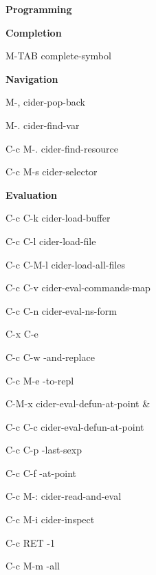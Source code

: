 \documentclass[a4paper,10pt]{article}
\renewcommand\section[1]{\bigskip\par\textbf{\large#1}\medskip}
\renewcommand\subsection[1]{\medskip\par\textbf{#1}\medskip}
\newcommand\keyify[1]{\keys{\ttfamily#1}}
\begin{document}
\begin{multicols}{2}

\section{Programming}
\subsection{Completion}

\begin{keylist}[labelwidth=\widthof{\keyify{C-c C-c}}]
  \item[M-TAB] complete-symbol
\end{keylist}

\subsection{Navigation}
\begin{keylist}[labelwidth=\widthof{\keyify{C-c M-.}}]
  \item[M-,] cider-pop-back
  \item[M-.] cider-find-var
  \item[C-c M-.] cider-find-resource
  \item[C-c M-s] cider-selector
\end{keylist}

\subsection{Evaluation}
\begin{keylist}[labelwidth=\widthof{\keyify{C-c RET}}]
  \item[C-c C-k] cider-load-buffer
  \item[C-c C-l] cider-load-file
  \item[C-c C-M-l] cider-load-all-files
  \item[C-c C-v] cider-eval-commands-map
  \item[C-c C-n] cider-eval-ns-form
  \item[C-x C-e] 
  \item[C-c C-w] \ns                     -and-replace
  \item[C-c M-e] \ns                     -to-repl
  \item[C-M-x]   cider-eval-defun-at-point
\&\item[C-c C-c] cider-eval-defun-at-point
  \item[C-c C-p] -last-sexp
  \item[C-c C-f] \ns                   -at-point
  \item[C-c M-:] cider-read-and-eval
  \item[C-c M-i] cider-inspect
  \item[C-c RET] -1
  \item[C-c M-m] \ns                   -all
\end{keylist}


\end{multicols}
\end{document}
